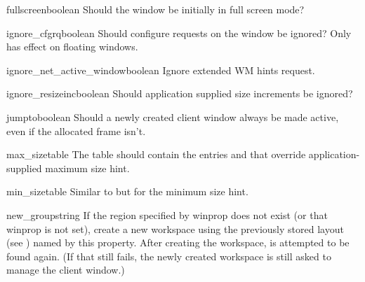 \begin{winprop}{fullscreen}{boolean}
    Should the window be initially in full screen mode?
\end{winprop}


\begin{winprop}{ignore_cfgrq}{boolean}
    Should configure requests on the window be ignored?
    Only has effect on floating windows.
\end{winprop}


\begin{winprop}{ignore_net_active_window}{boolean}
    Ignore extended WM hints  request. 
\end{winprop}


\begin{winprop}{ignore_resizeinc}{boolean}
    Should application supplied size increments be ignored?
\end{winprop}


\begin{winprop}{jumpto}{boolean}
    Should a newly created client window always be made
    active, even if the allocated frame isn't. 
\end{winprop}


\begin{winprop}{max_size}{table}
    The table should contain the entries  and  that
    override application-supplied maximum size hint. 
\end{winprop}


\begin{winprop}{min_size}{table}
    Similar to  but for the minimum size hint. 
\end{winprop}


\begin{winprop}{new_group}{string}
    If the region specified by  winprop does not exist
    (or that winprop is not set), create a new workspace using the 
    previously stored layout (see ) named by
    this property. After creating the workspace,  is 
    attempted to be found again. (If that still fails, the newly 
    created workspace is still asked to manage the client window.)
\end{winprop}


